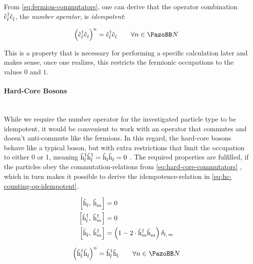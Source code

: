 From \autoref{eq:fermion-commutators}, one can derive that the operator combination $\hat{\text{c}}^{\dagger }_{l}\hat{\text{c}}^{ }_{l}$, the \emph{number operator}, is \emph{idempotent}: 

\begin{equation}
    \label{eq:fermion-counting-op-idempotent}
    \left(\cop{l}{\dagger}\cop{l}{}\right)^n = 
    \cop{l}{\dagger}\cop{l}{} \qquad \forall n \in \mathbb{N}
\end{equation}

This is a property that is necessary for performing a specific calculation later and makes sense, once one realizes, this restricts the  fermionic occupations to the values $0$ and $1$.

\paragraph{Hard-Core Bosons}\makebox{}\\

While we require the number operator for the investigated particle type to be idempotent, it would be convenient to work with an operator that commutes and doesn't anti-commute like the fermions. 
In this regard, the hard-core bosons behave like a typical boson, but with extra restrictions that limit the occupation to either $0$ or $1$, meaning $\hat{\text{h}}^{\dagger }_{l}\hat{\text{h}}^{\dagger }_{l} = \hat{\text{h}}^{ }_{l}\hat{\text{h}}^{ }_{l} = 0$ \cite{hardCoreBosonsBasics}.
The required properties are fulfilled, if the particles obey the commutation-relations from \autoref{eq:hard-core-commutators} \cite{hardCoreBosonsFullCommutationRelation}, which in turn makes it possible to derive the idempotence-relation in \autoref{eq:hc-counting-op-idempotent}.

\begin{equation}
    \label{eq:hard-core-commutators}
    \begin{split}
        \left[\hat{\text{h}}^{ }_{l},\,\hat{\text{h}}^{ }_{m}\right] &= 0\\
        \left[\hat{\text{h}}^{\dagger }_{l},\,\hat{\text{h}}^{\dagger }_{m}\right] &= 0\\
        \left[\hat{\text{h}}^{ }_{l},\,\hat{\text{h}}^{\dagger }_{m}\right] &= \left(1 - 2 \cdot \hat{\text{h}}^{\dagger }_{m}\hat{\text{h}}^{ }_{m} \right)\delta_{l,\,m}
    \end{split}
\end{equation}

\begin{equation}
    \label{eq:hc-counting-op-idempotent}
    \left(\hop{l}{\dagger}\hop{l}{}\right)^n = 
    \hop{l}{\dagger}\hop{l}{} \qquad \forall n \in \mathbb{N}
\end{equation}

